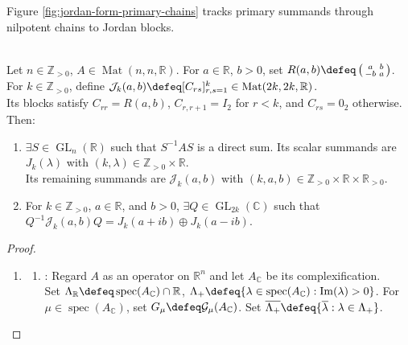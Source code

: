 Figure \ref{fig:jordan-form-primary-chains} tracks primary summands through nilpotent chains to Jordan blocks.

\begin{illustrationfigure}[H]
  \centering
  
  \caption{Primary pieces $\mathcal{G}_{\lambda_j}(T)$ decompose into nilpotent chains, which determine Jordan blocks.}
  \label{fig:jordan-form-primary-chains}
\end{illustrationfigure}

\begin{theorem} \label{thm:real-jordan-block-form} \\
Let $n\in\mathbb{Z}_{>0}$, $A\in\operatorname{Mat}(n,n,\mathbb{R})$. For $a\in\mathbb{R}$, $b>0$, set $R(a,b)\defeq\left(\begin{smallmatrix}a&b\\-b&a\end{smallmatrix}\right)$. For $k\in\mathbb{Z}_{>0}$, define $\mathcal{J}_k(a,b)\defeq[C_{rs}]_{r,s=1}^{k}\in\operatorname{Mat}(2k,2k,\mathbb{R})$.\\
Its blocks satisfy $C_{rr}=R(a,b)$, $C_{r,r+1}=I_2$ for $r<k$, and $C_{rs}=0_2$ otherwise. Then:
\begin{enumerate}[label=(\roman*)]
\setlength{\itemsep}{0pt}
\item $\exists S\in\operatorname{GL}_n(\mathbb{R})$ such that $S^{-1}AS$ is a direct sum. Its scalar summands are $J_k(\lambda)$ with $(k,\lambda)\in\mathbb{Z}_{>0}\times\mathbb{R}$.\\
Its remaining summands are $\mathcal{J}_k(a,b)$ with $(k,a,b)\in\mathbb{Z}_{>0}\times\mathbb{R}\times\mathbb{R}_{>0}$.
\item For $k\in\mathbb{Z}_{>0}$, $a\in\mathbb{R}$, and $b>0$, $\exists Q\in\operatorname{GL}_{2k}(\mathbb{C})$ such that $Q^{-1}\mathcal{J}_k(a,b)Q=J_k(a+ib)\oplus J_k(a-ib)$.
\end{enumerate}
\begin{proof}
\begin{enumerate}[label=(\roman*)]
\setlength{\itemsep}{0pt}
\item[$(i)$]
\begin{enumerate}[label=(\alph*)]
\setlength{\itemsep}{0pt}
\item {}: Regard $A$ as an operator on $\mathbb{R}^n$ and let $A_{\mathbb{C}}$ be its complexification.\\
Set $\Lambda_{\mathbb{R}}\defeq\operatorname{spec}(A_{\mathbb{C}})\cap\mathbb{R}$, $\Lambda_+\defeq\{\lambda\in\operatorname{spec}(A_{\mathbb{C}}):\operatorname{Im}(\lambda)>0\}$. For $\mu\in\operatorname{spec}(A_{\mathbb{C}})$, set $G_{\mu}\defeq\mathcal{G}_{\mu}(A_{\mathbb{C}})$. Set $\overline{\Lambda_+}\defeq\{\overline{\lambda}:\lambda\in\Lambda_+\}$.\\

\end{enumerate}
\end{enumerate}
\end{proof}
\end{theorem}
